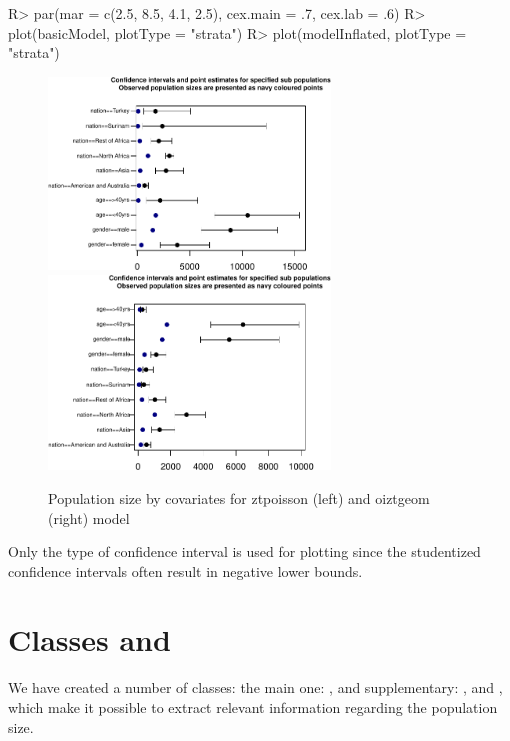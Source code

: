 \documentclass[
]{jss}
\newcommand{\1}{\mathcal{I}} \newcommand{\bZero}{\boldsymbol{0}}
\begin{document}
\begin{CodeChunk}
\begin{CodeInput}
R> par(mar = c(2.5, 8.5, 4.1, 2.5), cex.main = .7, cex.lab = .6)
R> plot(basicModel, plotType = "strata")
R> plot(modelInflated, plotType = "strata")
\end{CodeInput}
\begin{figure}[ht]

{\centering \includegraphics[width=7.5cm]{singleRcapture_files/figure-latex/strata_plot-1} \includegraphics[width=7.5cm]{singleRcapture_files/figure-latex/strata_plot-2} 

}

\caption[Population size by covariates for ztpoisson (left) and oiztgeom (right) model]{Population size by covariates for ztpoisson (left) and oiztgeom (right) model}\label{fig:strata_plot}
\end{figure}
\end{CodeChunk}

Only the  type of confidence interval is used for
plotting since the studentized confidence intervals often result in
negative lower bounds.

\section[Classes and S3Methods]{Classes and }\label{sec-methods}

We have created a number of classes: the main one:
,  and supplementary:
,  and
, which make it possible to extract relevant
information regarding the population size.
\end{document}
